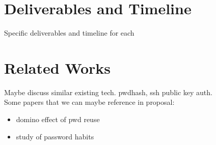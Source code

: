 \documentclass[11pt]{article}   %
\begin{document}
\section{Deliverables and Timeline}
Specific deliverables and timeline for each

\section{Related Works}
Maybe discuss similar existing tech. pwdhash, ssh public key auth.\\
Some papers that we can maybe reference in proposal:
\begin{itemize}
\item domino effect of pwd reuse \cite{domino}
\item study of password habits \cite{habits}
\end{itemize}


{}
\end{document}
